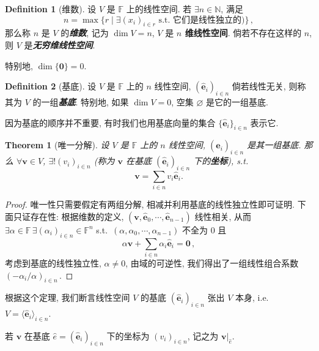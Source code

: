 \documentclass[openany]{ctexbook}
\newcommand*{\indexbf}[1]{\emph{\textbf{#1}}\index{#1}} %
\theoremstyle{plain}
\newtheorem{theorem}{Theorem}[section] %
\theoremstyle{definition}
\newtheorem{definition}{Definition}[section] %
\newcommand*{\basis}[1]{\hat{\boldsymbol{#1}}} %
\newcommand*{\bv}{\boldsymbol} %
\newcommand*{\inbasis}[2]{\left.%
	{#1}\right|_{#2}
}
\begin{document}
\begin{definition}[维数]
	设 $V$ 是 $\mathbb F$ 上的线性空间. 若 $\exists n \in \mathbb N$, 满足
	\begin{equation*}
		n = \max \{r \mid \exists (x_i)_{i \in r} \text{\ s.t.\ 它们是线性独立的}) \}\,,
	\end{equation*}
	那么称 $n$ 是 $V$ 的\indexbf{维数}, 记为 $\dim V = n$, $V$ 是 \textbf{$n$ 维线性空间}. 倘若不存在这样的 $n$, 则 $V$ 是\indexbf{无穷维线性空间}. 
\end{definition}

特别地, $\dim \{\bv 0\} = 0$.

\begin{definition}[基底]
	设 $V$ 是 $\mathbb F$ 上的 $n$ 线性空间, $(\basis e_i)_{i \in n}$ 倘若线性无关, 则称其为 $V$ 的一组\indexbf{基底}. 特别地, 如果 $\dim V = 0$, 空集 $\varnothing$ 是它的一组基底.
\end{definition}

因为基底的顺序并不重要, 有时我们也用基底向量的集合 $\{\basis e_i\}_{i \in n}$ 表示它.

\begin{theorem}[唯一分解]\label{theorem: 唯一分解}
	设 $V$ 是 $\mathbb F$ 上的 $n$ 线性空间, $(\basis e_i)_{i \in n}$ 是其一组基底.
	那么 $\forall \bv v \in V$, $\exists ! (v_i)_{i \in n}$ (称为 $\bv v$ 在基底 $(\basis e_i)_{i \in n}$ 下的\indexbf{坐标}), s.t.\ 
	\begin{equation*}
		\bv v = \sum_{i \in n} v_i \basis e_i.
	\end{equation*}
\end{theorem}
\begin{proof}
	唯一性只需要假定有两组分解, 相减并利用基底的线性独立性即可证明. 
	下面只证存在性:
	根据维数的定义, $(\bv v, \basis e_0, \cdots, \basis e_{n - 1})$ 线性相关, 从而
	$\exists \alpha \in \mathbb F\, \exists (\alpha_i)_{i \in n} \in \mathbb F^n$ s.t.\ $(\alpha, \alpha_0, \cdots, \alpha_{n - 1})$ 不全为 $0$ 且
	\begin{equation*}
		\alpha \bv v + \sum_{i \in n} \alpha_i \basis e_i = \bv 0\,,
	\end{equation*}
	考虑到基底的线性独立性, $\alpha \neq 0$, 由域的可逆性, 我们得出了一组线性组合系数 $( - \alpha_i / \alpha)_{i \in n}$\,.
\end{proof}

根据这个定理, 我们断言线性空间 $V$ 的基底 $(\basis e_i)_{i \in n}$ 张出 $V$ 本身, 
i.e.\ $V = \langle\basis e_i\rangle_{i \in n}$. 

若 $\bv v$ 在基底 $\hat e = (\basis e_i)_{i \in n}$ 下的坐标为 $(v_i)_{i \in n}$, 记之为 $\inbasis{\bv v}{\hat e}$. 
\end{document}
